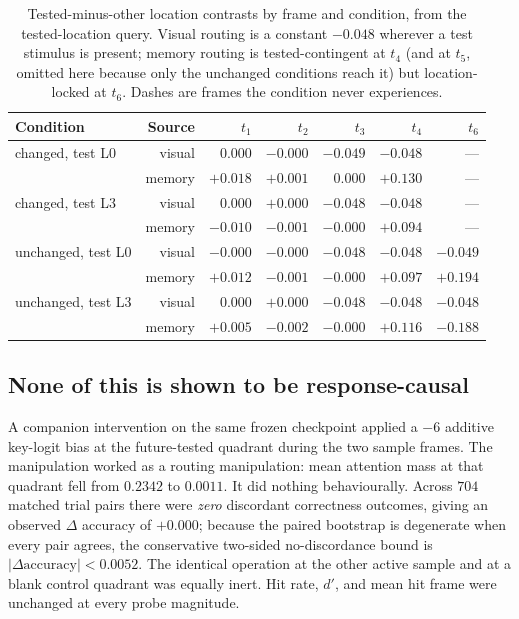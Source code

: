 \documentclass[10pt]{article}
\begin{document}
\begin{table}[t]
\centering
\small
\caption{Tested-minus-other location contrasts by frame and condition, from the
tested-location query. Visual routing is a constant $-0.048$ wherever a test stimulus is
present; memory routing is tested-contingent at $t_4$ (and at $t_5$, omitted here because
only the unchanged conditions reach it) but location-locked at $t_6$. Dashes are frames the
condition never experiences.}
\label{tab:contrasts}
\begin{tabularx}{\textwidth}{Y r r r r r r}
\toprule
Condition & Source & $t_1$ & $t_2$ & $t_3$ & $t_4$ & $t_6$\\
\midrule
changed, test L0   & visual & $0.000$ & $-0.000$ & $-0.049$ & $-0.048$ & ---\\
                   & memory & $+0.018$ & $+0.001$ & $0.000$ & $+0.130$ & ---\\
changed, test L3   & visual & $0.000$ & $+0.000$ & $-0.048$ & $-0.048$ & ---\\
                   & memory & $-0.010$ & $-0.001$ & $-0.000$ & $+0.094$ & ---\\
unchanged, test L0 & visual & $-0.000$ & $-0.000$ & $-0.048$ & $-0.048$ & $-0.049$\\
                   & memory & $+0.012$ & $-0.001$ & $-0.000$ & $+0.097$ & $\mathbf{+0.194}$\\
unchanged, test L3 & visual & $0.000$ & $+0.000$ & $-0.048$ & $-0.048$ & $-0.048$\\
                   & memory & $+0.005$ & $-0.002$ & $-0.000$ & $+0.116$ & $\mathbf{-0.188}$\\
\bottomrule
\end{tabularx}
\end{table}

\subsection{None of this is shown to be response-causal}

A companion intervention on the same frozen checkpoint applied a $-6$ additive key-logit
bias at the future-tested quadrant during the two sample frames. The manipulation worked as
a routing manipulation: mean attention mass at that quadrant fell from $0.2342$ to $0.0011$.
It did nothing behaviourally. Across $704$ matched trial pairs there were \emph{zero}
discordant correctness outcomes, giving an observed $\Delta$ accuracy of $+0.000$; because
the paired bootstrap is degenerate when every pair agrees, the conservative two-sided
no-discordance bound is $|\Delta\text{accuracy}| < 0.0052$. The identical operation at the
other active sample and at a blank control quadrant was equally inert. Hit rate, $d'$, and
mean hit frame were unchanged at every probe magnitude.
\end{document}
